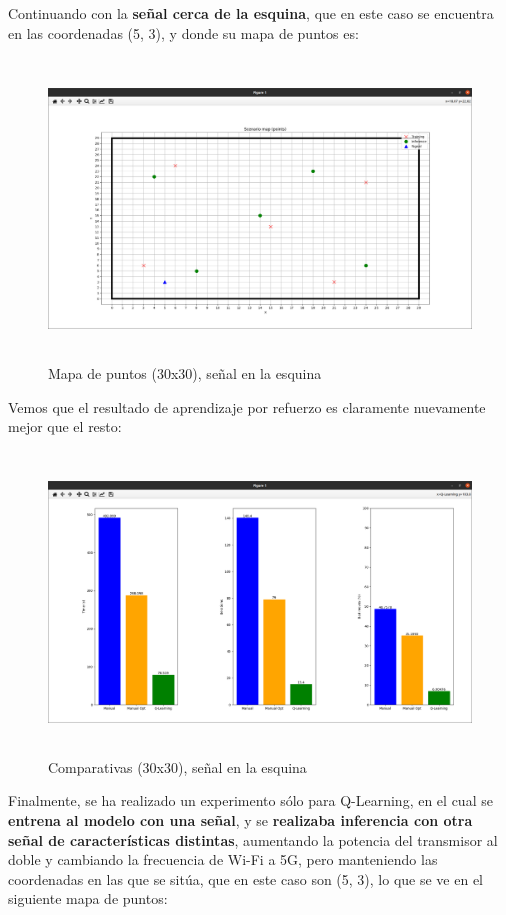 Continuando con la \textbf{señal cerca de la esquina}, que en este caso se encuentra en las coordenadas (5, 3), y donde su mapa de puntos es:\\

\begin{figure} [H]
    \begin{center}
    \includegraphics[height=8cm]{imagenes/cap4/23_mapa_p_esq_30.png}
    \end{center}
    \caption[Mapa de puntos (30x30), señal en la esquina]{Mapa de puntos (30x30), señal en la esquina}
    \label{fig:map_p_esq_30}
\end{figure}

Vemos que el resultado de aprendizaje por refuerzo es claramente nuevamente mejor que el resto:\\

\begin{figure} [H]
    \begin{center}
    \includegraphics[height=8cm]{imagenes/cap4/24_comp_esq_30.png}
    \end{center}
    \caption[Comparativas (30x30), señal en la esquina]{Comparativas (30x30), señal en la esquina}
    \label{fig:comp_esq_30}
\end{figure}
\newpage
Finalmente, se ha realizado un experimento sólo para Q-Learning, en el cual se \textbf{entrena al modelo con una señal}, y se \textbf{realizaba inferencia con otra señal de características distintas}, aumentando la potencia del transmisor al doble y cambiando la frecuencia de Wi-Fi a 5G, pero manteniendo las coordenadas en las que se sitúa, que en este caso son (5, 3), lo que se ve en el siguiente mapa de puntos:\\

